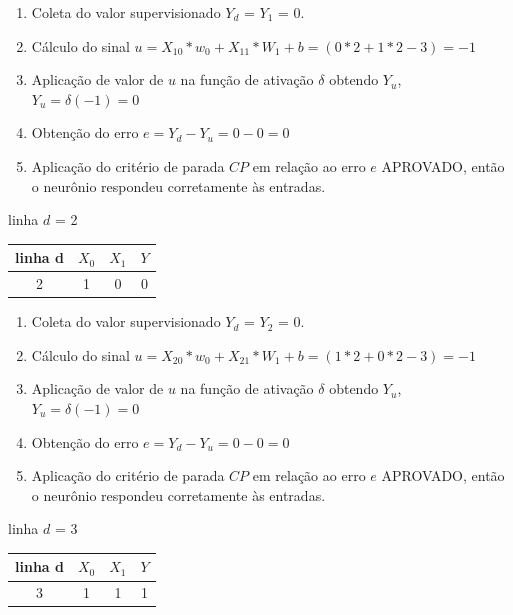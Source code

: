 \documentclass[	12pt, Times, openright, twoside, a4paper, english, brazil]{abntex2}
\begin{document}
            	\begin{enumerate}
            	    \item Coleta do valor supervisionado $Y_d$ = $Y_1$ = 0.
            		\item Cálculo do sinal $u = X_{10}*w_0 + X_{11}*W_1 +b  = (0*2 + 1*2 -3) = -1$
            		\item Aplicação de valor de $u$ na função de ativação $\delta$ obtendo $Y_u$, $Y_u = \delta(-1) = 0$
            		\item Obtenção do erro $e = Y_d-Y_u = 0 - 0 = 0$
            		\item Aplicação do critério de parada $CP$ em relação ao erro $e$ APROVADO, então o neurônio respondeu corretamente às entradas.
            	\end{enumerate}
            
            	linha $d$ = 2\\
            	    \begin{table}[!ht]
                    \centering
    				\begin{tabular}{|c|c|c|c|}
    					\hline  \textbf{linha d} & \textbf{$X_0$} & \textbf{$X_1$} &  \textbf{$Y$}\\
  				 	    \hline 2 & 1 & 0 & 0\\
    				\end{tabular}
    				\end{table}
    				
            	\begin{enumerate}
            	    \item Coleta do valor supervisionado $Y_d$ = $Y_2$ = 0.
            		\item Cálculo do sinal $u = X_{20}*w_0 + X_{21}*W_1 +b  = (1*2 + 0*2 -3) = -1$
            		\item Aplicação de valor de $u$ na função de ativação $\delta$ obtendo $Y_u$, $Y_u = \delta(-1) = 0$
            		\item Obtenção do erro $e = Y_d-Y_u = 0 - 0 = 0$
            		\item Aplicação do critério de parada $CP$ em relação ao erro $e$ APROVADO, então o neurônio respondeu corretamente às entradas.
            	\end{enumerate}
            
            	linha $d$ = 3\\
            	    \begin{table}[!ht]
                    \centering
    				\begin{tabular}{|c|c|c|c|}
    					\hline  \textbf{linha d} & \textbf{$X_0$} & \textbf{$X_1$} &  \textbf{$Y$}\\
  				 	    \hline 3 & 1 & 1 & 1\\
    				\end{tabular}
    				\end{table}
    				
\end{document}
